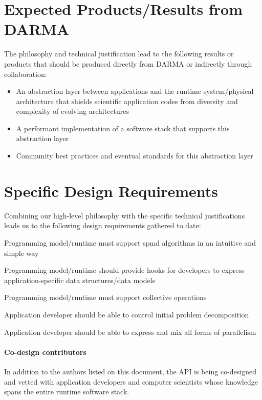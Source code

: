 \section{Expected Products/Results from DARMA}
The philosophy and technical justification lead to the following results or products that should be produced directly from DARMA or indirectly through collaboration:
\begin{itemize}
\item An abstraction layer between applications and the
runtime system/physical architecture that shields scientific application codes
from diversity and complexity of evolving architectures
\item A performant implementation of a software stack that supports this
abstraction layer
\item Community best practices and eventual standards for this abstraction
layer
\end{itemize}

\section{Specific Design Requirements}
Combining our high-level philosophy with the specific technical justifications leads us to the following design requirements gathered to date:
\begin{compactitem}
\item Programming model/runtime must support \gls{spmd} algorithms in an intuitive and simple way
\item Programming model/runtime should provide hooks for developers to express application-specific data structures/data models
\item Programming model/runtime must support collective operations
\item Application developer should be able to control initial problem decomposition
\item Application developer should be able to express and mix all forms of
parallelism
\end{compactitem}


\paragraph{Co-design contributors}
In addition to the authors listed on this document,
the \gls{API} is being \gls{co-design}ed and vetted with application developers
and computer scientists whose knowledge spans the entire runtime software stack.


